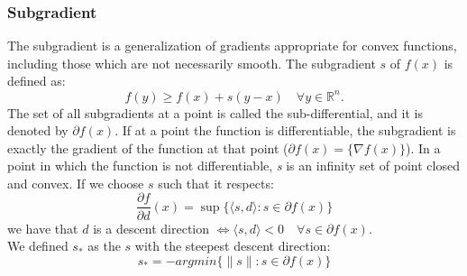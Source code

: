 \subsubsection{Subgradient}
The subgradient is a generalization of gradients appropriate for convex functions, including those which are not necessarily smooth.
The subgradient $s$ of $f(x)$ is defined as:
\begin{equation}
f(y) \geq f(x) +s(y-x) \quad \forall y \in \mathbb{R}^n.
\end{equation}
The set of all subgradients at a point is called the sub-differential, and it is denoted by $\partial f(x)$. 
If at a point the function is differentiable, the subgradient is exactly the gradient of the function at that point ($\partial f(x)= \{\nabla f(x) \}$).
In a point in which the function is not differentiable, \textit{s} is an infinity set of point closed and convex.
If we choose $s$ such that it respects:
\begin{equation}
\frac{\partial f}{\partial d}(x)=\sup\{\langle s,d \rangle : s \in \partial f(x)\} 
\end{equation} 
we have that $d$ is a descent direction $\iff \langle s,d\rangle <0 \quad \forall s \in \partial f(x)$.
\\ We defined $s_*$ as the $s$ with the steepest descent direction:
\begin{equation}
s_*= -argmin\{\parallel s\parallel : s\in \partial f(x) \}
\end{equation} 
